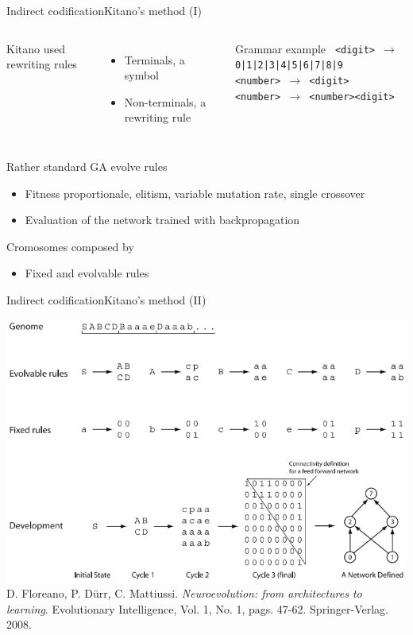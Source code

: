 \documentclass[10pt,compress]{beamer} %
\begin{document}
\begin{frame}[fragile]{Indirect codification}{Kitano's method (I)}
    \begin{columns}
	   Kitano used rewriting rules
	   \begin{itemize}
	   	\item Terminals, a symbol 
		\item Non-terminals, a rewriting rule
	   \end{itemize}

	   		\begin{exampleblock}{Grammar example}
				\small{
				\texttt{
				<digit> $\longrightarrow$ 0|1|2|3|4|5|6|7|8|9\\
				<number> $\longrightarrow$ <digit>\\
				<number> $\longrightarrow$ <number><digit>}
				}
			\end{exampleblock}
    \end{columns}

	\bigskip
	Rather standard GA evolve rules
	\begin{itemize}
		\item Fitness proportionale, elitism, variable mutation rate, single crossover
		\item Evaluation of the network trained with backpropagation
	\end{itemize}

	Cromosomes composed by
	\begin{itemize}
		\item Fixed and evolvable rules
	\end{itemize}

\end{frame}

\begin{frame}[plain]{Indirect codification}{Kitano's method (II)}
	\begin{center}
	\includegraphics[width=\linewidth]{figs/kitano.png}\\
    \tiny{D. Floreano, P. D\"urr, C. Mattiussi. \textit{Neuroevolution: from architectures to learning}. Evolutionary Intelligence, Vol. 1, No. 1, pags. 47-62. Springer-Verlag. 2008.}
	\end{center}
\end{frame}
\end{document}
